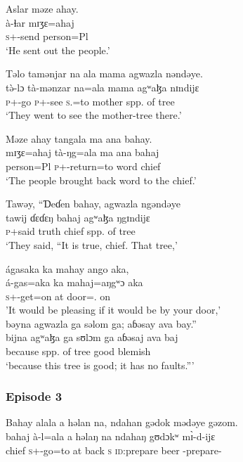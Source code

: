 \ea   Aslar  məze  ahay.  \\
 \gll à-ɬar    mɪʒɛ=ahaj\\
  \textsc{s}+{\PFV}-send    person=Pl\\
 \glt ‘He sent out the people.’
 \z

\ea   Təlo  tamənjar  na  ala  mama  agwazla  nəndəye.\\ 
\gll t\`ə-lɔ             tà-mənzar            na=ala  mama   agʷaɮa     nɪndijɛ\\
  \textsc{p}+{\PFV}-go  \textsc{p}+{\HOR}-see  \textsc{s}.{\DO}=to     mother  {spp. of tree}  {\DEM}\\
  \glt ‘They went to see the mother-tree there.’
  \z

\ea   Məze  ahay  tangala  ma  ana  bahay.\\
 \gll mɪʒɛ=ahaj   tà-ŋg=ala  ma      ana  bahaj\\
  person=Pl    \textsc{p}+{\PFV}-return=to   word  {\DAT}  chief\\
  \glt ‘The people brought back word to the chief.’
  \z

\ea   Tawəy,  “Ɗeɗen  bahay,  agwazla  ngəndəye \\
  \gll tawij     ɗɛɗɛŋ   bahaj    agʷaɮa  ŋgɪndijɛ \\  
  \textsc{p}+said  truth     chief     {spp. of tree}    {\DEM}  \\
  \glt ‘They said, “It is true, chief. That tree,'
  
  \medskip  
 ágasaka  ka  mahay  ango  aka, \\
\gll   á-gas=aka   ka    mahaj=aŋgʷɔ aka\\
  \textsc{s}+{\IFV}-get=on    at   door={\twoS}.{\POSS} on\\
  \glt 'It would be pleasing if it would be by your door,’\\
  
  \medskip
 bəyna  agwazla  ga  səlom  ga;  aɓəsay  ava  bay.”\\
 \gll bijna      agʷaɮa  ga    sʊlɔm ga  aɓəsaj  ava     baj\\ 
 because   {spp. of tree}  {\ADJ}   good   {\ADJ}   blemish   {\EXT}  {\NEG}\\
  \glt ‘because this tree is good;  it has no faults.”’
  \z
  
 \subsubsection*{Episode 3}
\ea   Bahay  alala  a  həlan  na,  ndahan  gədok  mədəye  gəzom.\\
\gll  bahaj  à-l=ala    a   həlaŋ   na  ndahaŋ  gʊdɔkʷ m\`ɪ-d-ijɛ\\      
 chief   \textsc{s}+{\PFV}-go=to   at   back   {\PSP}  \textsc{s}        {\textsc{id}:prepare beer}  {\NOM}-prepare-{\CL}\\ 
 
